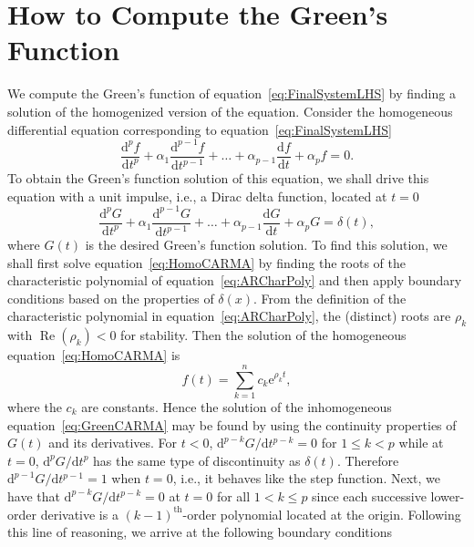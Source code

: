 \documentclass[a4paper,fleqn,usenatbib]{mnras}
\begin{document}
\section[Green's Function Computation]{How to Compute the Green's Function}\label{sec:GFComputation}

We compute the Green's function of equation~\eqref{eq:FinalSystemLHS} by finding a solution of the homogenized version of the equation. Consider the homogeneous differential equation corresponding to equation~\eqref{eq:FinalSystemLHS}
\begin{equation}\label{eq:HomoCARMA}
\frac{\mathrm{d}^{p}f}{\mathrm{d}t^{p}} + \alpha_{1} \frac{\mathrm{d}^{p-1}f}{\mathrm{d}t^{p-1}} + \ldots + \alpha_{p-1} \frac{\mathrm{d}f}{\mathrm{d}t} + \alpha_{p} f = 0.
\end{equation}
To obtain the Green's function solution of this equation, we shall drive this equation with a unit impulse, i.e., a Dirac delta function, located at $t = 0$
\begin{equation}\label{eq:GreenCARMA}
\frac{\mathrm{d}^{p}G}{\mathrm{d}t^{p}} + \alpha_{1} \frac{\mathrm{d}^{p-1}G}{\mathrm{d}t^{p-1}} + \ldots + \alpha_{p-1} \frac{\mathrm{d}G}{\mathrm{d}t} + \alpha_{p} G = \delta(t),
\end{equation}
where $G(t)$ is the desired Green's function solution. To find this solution, we shall first solve equation~\eqref{eq:HomoCARMA} by finding the roots of the characteristic polynomial of equation~\eqref{eq:ARCharPoly} and then apply boundary conditions based on the properties of $\delta(x)$. From the definition of the characteristic polynomial in equation~\eqref{eq:ARCharPoly}, the (distinct) roots are $\rho_{k}$ with $\operatorname{Re}(\rho_{k}) < 0$ for stability. Then the solution of the homogeneous equation~\eqref{eq:HomoCARMA} is
\begin{equation}\label{eq:HomoSol}
f(t) = \sum_{k = 1}^{n} c_{k} \mathrm{e}^{\rho_{k}t},
\end{equation}
where the $c_{k}$ are constants. Hence the solution of the inhomogeneous equation~\eqref{eq:GreenCARMA} may be found by using the continuity properties of $G(t)$ and its derivatives. For $t < 0$, $\mathrm{d}^{p-k}G/\mathrm{d}t^{p-k} = 0$ for $1 \leq k < p$ while at $t = 0$, $\mathrm{d}^{p}G/\mathrm{d}t^{p}$ has the same type of discontinuity as $\delta(t)$. Therefore $\mathrm{d}^{p-1}G/\mathrm{d}t^{p-1} = 1$ when $t = 0$, i.e., it behaves like the step function. Next, we have that $\mathrm{d}^{p-k}G/\mathrm{d}t^{p-k} = 0$ at $t = 0$ for all $1 < k \leq p$ since each successive lower-order derivative is a $(k-1)^{\mathrm{th}}$-order polynomial located at the origin. Following this line of reasoning, we arrive at the following boundary conditions
\end{document}
